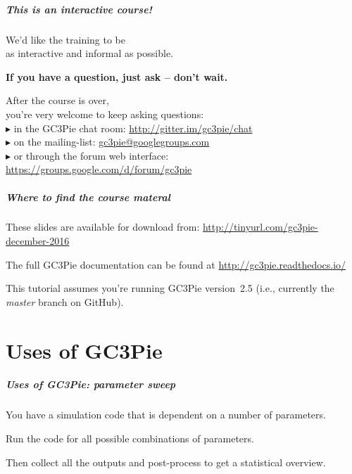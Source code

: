 \documentclass[english,serif,mathserif,usenames,dvipsnames]{beamer}
\begin{document}
\begin{frame}
  \frametitle{This is an \emph{interactive} course!}
  \begin{center}
    We'd like the training to be \\ as interactive and informal as possible.

    \+ \textbf{If you have a question, just ask -- don't wait.}

    \+
    After the course is over, \\ you're very welcome to keep asking questions:
    \\[1ex]
    $\blacktriangleright$ in the GC3Pie chat room:
    {\small \url{http://gitter.im/gc3pie/chat}}
    \\[1ex]
    $\blacktriangleright$ on the mailing-list:
    \href{mailto:gc3pie@googlegroups.com}{gc3pie@googlegroups.com}
    \\[1ex]
    $\blacktriangleright$ or through the forum web interface: \\ {\small
      \url{https://groups.google.com/d/forum/gc3pie}}
\end{center}
\end{frame}


\begin{frame}[fragile]
  \frametitle{Where to find the course materal}
  \begin{center}
    These slides are available for download from:
    \url{http://tinyurl.com/gc3pie-december-2016}

    \+
    The full GC3Pie documentation can be found at
    \url{http://gc3pie.readthedocs.io/}

    \+
    This tutorial assumes you're running GC3Pie version~2.5
    (i.e., currently the \emph{master} branch on GitHub).
  \end{center}
\end{frame}



\part{Uses of GC3Pie}

\begin{frame}[fragile]
  \frametitle{Uses of GC3Pie: parameter sweep}

  You have a simulation code that is dependent on a number of parameters.

  \+
  Run the code for all possible combinations of parameters.

  \+
  Then collect all the outputs and post-process to get a
  statistical overview.
\end{frame}
\end{document}
